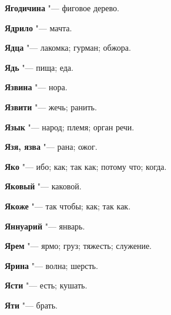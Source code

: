 \begin{mymulticols}
\noindent\textbf{Ягодичина} "--- фиговое дерево. 

\noindent\textbf{Ядрило} "--- мачта. 

\noindent\textbf{Ядца} "--- лакомка; гурман; обжора. 

\noindent\textbf{Ядь} "--- пища; еда. 

\noindent\textbf{Язвина} "--- нора. 

\noindent\textbf{Язвити} "--- жечь; ранить. 

\noindent\textbf{Язык} "--- народ; племя; орган речи. 

\noindent\textbf{Язя, язва} "--- рана; ожог. 

\noindent\textbf{Яко} "--- ибо; как; так как; потому что; когда. 

\noindent\textbf{Яковый} "--- каковой. 

\noindent\textbf{Якоже} "--- так чтобы; как; так как. 

\noindent\textbf{Яннуарий} "--- январь. 

\noindent\textbf{Ярем} "--- ярмо; груз; тяжесть; служение. 

\noindent\textbf{Ярина} "--- волна; шерсть. 

\noindent\textbf{Ясти} "--- есть; кушать. 

\noindent\textbf{Яти} "--- брать. 
\normalfont\end{mymulticols}
\mychapterending

 

